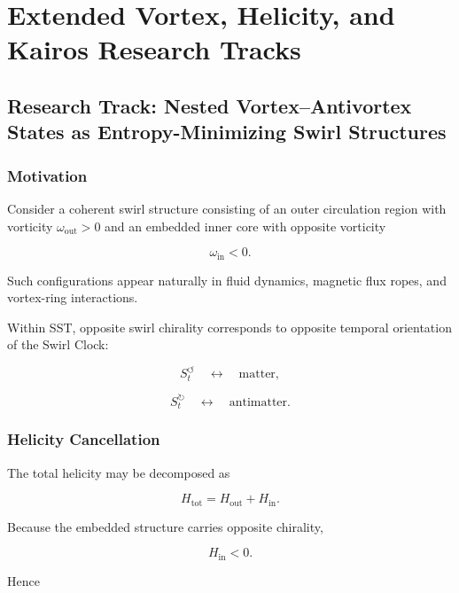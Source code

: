 \section{Extended Vortex, Helicity, and Kairos Research Tracks}

\subsection{Research Track: Nested Vortex--Antivortex States as Entropy-Minimizing Swirl Structures}
    
    \subsubsection{Motivation}
        
        Consider a coherent swirl structure consisting of an outer circulation region
        with vorticity $\omega_{\mathrm{out}}>0$ and an embedded inner core with
        opposite vorticity
        
        \[
            \omega_{\mathrm{in}}<0.
        \]
        
        Such configurations appear naturally in fluid dynamics, magnetic flux ropes,
        and vortex-ring interactions.
        
        Within SST, opposite swirl chirality corresponds to opposite temporal
        orientation of the Swirl Clock:
        
        \[
            S_t^{\circlearrowleft}
            \quad\leftrightarrow\quad
            \text{matter},
        \]
        
        \[
            S_t^{\circlearrowright}
            \quad\leftrightarrow\quad
            \text{antimatter}.
        \]
    
    \subsubsection{Helicity Cancellation}
        
        The total helicity may be decomposed as
        
        \[
            H_{\mathrm{tot}}
            =
            H_{\mathrm{out}}
            +
            H_{\mathrm{in}}.
        \]
        
        Because the embedded structure carries opposite chirality,
        
        \[
            H_{\mathrm{in}}<0.
        \]
        
        Hence
        
